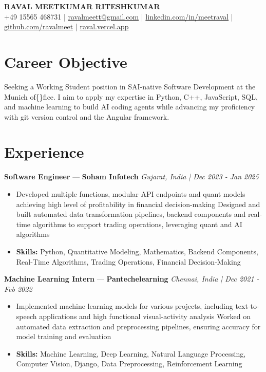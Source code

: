 \documentclass[a4paper,10pt]{article}
\begin{document}
\begin{center}
  {\Large\bfseries RAVAL MEETKUMAR RITESHKUMAR}\\[2pt]
  {\small +49 15565 468731 \;|\; \href{mailto:ravalmeett@gmail.com}{ravalmeett@gmail.com} \;|\; \href{https://www.linkedin.com/in/meetraval/}{linkedin.com/in/meetraval} \;|\; \href{https://github.com/ravalmeet}{github.com/ravalmeet} \;|\; \href{https://raval.vercel.app/}{raval.vercel.app}}
\end{center}
\vspace{-3pt}

\section*{Career Objective}
Seeking a Working Student position in SAI-native Software Development at the Munich of\{\}fice. I aim to apply my expertise in Python, C++, JavaScript, SQL, and machine learning to build AI coding agents while advancing my proficiency with git version control and the Angular framework.\par

\section*{Experience}
\textbf{Software Engineer} — \textbf{Soham Infotech} \hfill \textit{Gujarat, India \;|\; Dec 2023 - Jan 2025}\par
\vspace{1pt}
\begin{itemize}
  \item Developed multiple functions, modular API endpoints and quant models achieving high level of profitability in financial decision-making Designed and built automated data transformation pipelines, backend components and real-time algorithms to support trading operations, leveraging quant and AI algorithms
  \item \textbf{Skills:} Python, Quantitative Modeling, Mathematics, Backend Components, Real-Time Algorithms, Trading Operations, Financial Decision-Making
\end{itemize}
\vspace{3pt}
\textbf{Machine Learning Intern} — \textbf{Pantechelearning} \hfill \textit{Chennai, India \;|\; Dec 2021 - Feb 2022}\par
\vspace{1pt}
\begin{itemize}
  \item Implemented machine learning models for various projects, including text-to-speech applications and high functional visual-activity analysis Worked on automated data extraction and preprocessing pipelines, ensuring accuracy for model training and evaluation
  \item \textbf{Skills:} Machine Learning, Deep Learning, Natural Language Processing, Computer Vision, Django, Data Preprocessing, Reinforcement Learning
\end{itemize}
\end{document}
